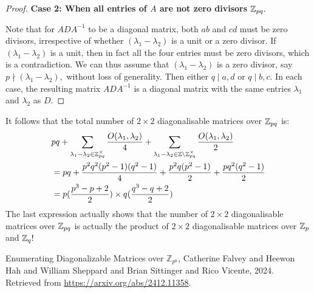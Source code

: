\documentclass[11pt, titlepage, a4paper]{article}
\begin{document}
\begin{proof}
\textbf{Case 2: When all entries of $A$ are not zero divisors $\mathbb{Z}_{pq}.$} 

Note that for $ADA^{-1}$ to be a diagonal matrix, both $ab$ and $cd$ must be zero divisors, irrespective of whether $(\lambda_{1}-\lambda_{2})$ is a unit or a zero divisor. If $(\lambda_{1}-\lambda_{2})$ is a unit, then in fact all the four entries must be zero divisors, which is a contradiction. We can thus assume that $(\lambda_{1}-\lambda_{2})$ is a zero divisor, say $p \nmid (\lambda_{1}-\lambda_{2}),$ without loss of generality. Then either $q \mid a,d$ or $q \mid b,c.$ In each case, the resulting matrix $ADA^{-1}$ is a diagonal matrix with the same entries $\lambda_{1}$ and $\lambda_{2}$ as $D.$
\end{proof}


It follows that the total number of $2\times 2$ diagonalisable matrices over $\mathbb{Z}_{pq}$ is:
\begin{align*}
& pq +  \sum_{\lambda_{1}-\lambda_{2} \in \mathbb{Z}_{pq}^{\times}} \frac{O(\lambda_{1},\lambda_{2})}{4} +  \sum_{\lambda_{1}-\lambda_{2} \in \mathbb{Z}\backslash \mathbb{Z}_{pq}^{\times}} \frac{O(\lambda_{1},\lambda_{2})}{2} \\ 
& = pq + \frac{p^{2}q^{2}(p^{2}-1)(q^{2}-1)}{4} + \frac{p^{2}q(p^{2}-1)}{2} + \frac{pq^{2}(q^{2}-1)}{2} \\
& = p(\frac{p^{3}-p+2}{2})\times q(\frac{q^{3}-q+2}{2})
\end{align*}
The last expression actually shows that the number of $2\times 2$ diagonalisable matrices over $\mathbb{Z}_{pq}$ is actually the product of $2\times 2$ diagonalisable matrices over $\mathbb{Z}_{p}$ and $\mathbb{Z}_{q}!$


\begin{thebibliography}{}

 Enumerating Diagonalizable Matrices over $\mathbb{Z}_{p^k}$, Catherine Falvey and Heewon Hah and William Sheppard and Brian Sittinger and Rico Vicente, 2024. Retrieved from \url{https://arxiv.org/abs/2412.11358}.
 
\end{thebibliography}
\end{document}
